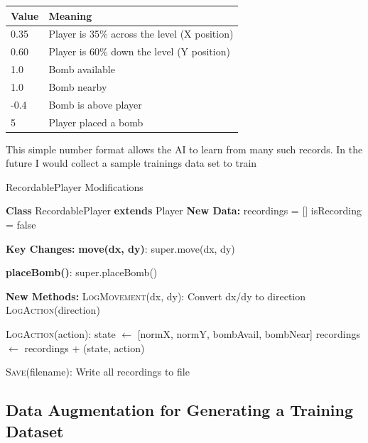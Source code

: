 \documentclass[sigconf]{acmart} %
\begin{document}
\begin{center}
	\begin{tabular}{|l|l|}
		\hline
		\textbf{Value} & \textbf{Meaning} \\ 
		\hline
		0.35 & Player is 35\% across the level (X position) \\ 
		0.60 & Player is 60\% down the level (Y position) \\ 
		1.0 & Bomb available \\ 
		1.0 & Bomb nearby \\ 
		-0.4 & Bomb is above player \\ 
		5 & Player placed a bomb \\ 
		\hline
	\end{tabular}
\end{center}

This simple number format allows the AI to learn from many such records. In the future I would collect a sample trainings data set to train 

\begin{algorithm}[t]
	\caption{RecordablePlayer Modifications}
	\label{alg:recording}
	\DontPrintSemicolon
	
	\textbf{Class} RecordablePlayer \textbf{extends} Player\;
	\nl\textbf{New Data:} 
	recordings = [] \;
	isRecording = false 
	
	\BlankLine
	\nl\textbf{Key Changes:}\;
	\nl \textbf{move(dx, dy)}:
	super.move(dx, dy)\;
	
	\nl \textbf{placeBomb()}:
	super.placeBomb()\;
	
	\BlankLine
	\nl\textbf{New Methods:}\;
	\nl\textsc{LogMovement}(dx, dy):
	Convert dx/dy to direction\;
	\textsc{LogAction}(direction)\;
	
	\nl\textsc{LogAction}(action):
	state $\leftarrow$ [normX, normY, bombAvail, bombNear]\;
	recordings $\leftarrow$ recordings + (state, action)\;
	
	\nl\textsc{Save}(filename):
	Write all recordings to file\;
\end{algorithm}

\subsection{Data Augmentation for Generating a Training Dataset}
\label{subsec:data_augmentation}
\end{document}
